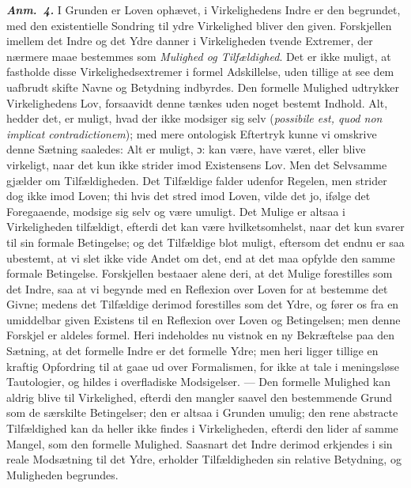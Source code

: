 \documentclass[12pt]{book}
\newcommand{\anm}[1]{\emph{\textbf{Anm.~#1.}}}
\newcommand{\dsi}{\textup{ɔ:}}
\newcommand{\opage}[1]{\marginnote{\footnotesize\textit{[#1]}}}
\begin{document}
\anm{4} I Grunden er Loven ophævet, i Virkelighedens Indre er den begrundet, med den
existentielle Sondring til ydre Virkelighed bliver den given. Forskjellen imellem det Indre
og det Ydre danner i Virkeligheden tvende Extremer, der nærmere maae bestemmes som
\emph{Mulighed og Tilfældighed}. Det er ikke muligt, at fastholde disse Virkelighedsextremer
i formel Adskillelse, uden tillige at see dem uafbrudt skifte Navne og Betydning indbyrdes.
Den formelle Mulighed udtrykker Virkelighedens Lov, forsaavidt denne tænkes uden noget
bestemt Indhold. Alt, hedder det, er muligt, hvad der ikke modsiger sig selv
(\textit{possibile est, quod non implicat contradictionem}); med mere ontologisk Eftertryk
kunne vi omskrive denne Sætning saaledes: Alt er muligt, \dsi{} kan være, have været, eller
blive virkeligt, naar det kun ikke strider imod Existensens Lov. Men det Selvsamme gjælder om
Tilfældigheden. Det Tilfældige falder udenfor Regelen, men strider dog ikke imod Loven; thi
hvis det stred imod Loven, vilde det jo, ifølge det Foregaaende, modsige sig selv og være
umuligt. Det Mulige er altsaa i Virkeligheden tilfældigt, efterdi det kan være
hvilketsomhelst, naar det kun svarer til sin formale Betingelse; og det Tilfældige blot
muligt, eftersom det endnu er saa ubestemt, at vi slet ikke vide Andet om det, end at det maa
opfylde den samme formale Betingelse. Forskjellen bestaaer alene deri, at det Mulige
forestilles som det Indre, saa at vi begynde med en Reflexion over Loven for at bestemme det
Givne; medens det Tilfældige derimod forestilles som det Ydre, og fører os fra en umiddelbar
given
\opage{150} Existens til en Reflexion over Loven og Betingelsen; men denne Forskjel er aldeles formel.
Heri indeholdes nu vistnok en ny Bekræftelse paa den Sætning, at det formelle Indre er det
formelle Ydre; men heri ligger tillige en kraftig Opfordring til at gaae ud over
Formalismen, for ikke at tale i meningsløse Tautologier, og hildes i overfladiske
Modsigelser. --- Den formelle Mulighed kan aldrig blive til Virkelighed, efterdi den mangler
saavel den bestemmende Grund som de særskilte Betingelser; den er altsaa i Grunden umulig;
den rene abstracte Tilfældighed kan da heller ikke findes i Virkeligheden, efterdi den lider
af samme Mangel, som den formelle Mulighed. Saasnart det Indre derimod erkjendes i sin reale
Modsætning til det Ydre, erholder Tilfældigheden sin relative Betydning, og Muligheden
begrundes.
\end{document}
